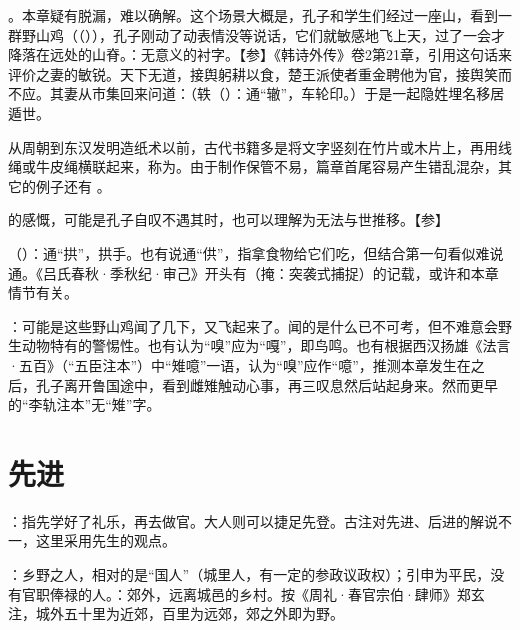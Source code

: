 {
\item {}。本章疑有脱漏，难以确解。这个场景大概是，孔子和学生们经过一座山，看到一群野山鸡（（）），孔子刚动了动表情没等说话，它们就敏感地飞上天，过了一会才降落在远处的山脊。：无意义的衬字。【参】《韩诗外传》卷2第21章，引用这句话来评价之妻的敏锐。天下无道，接舆躬耕以食，楚王派使者重金聘他为官，接舆笑而不应。其妻从市集回来问道：（轶（）：通“辙”，车轮印。）于是一起隐姓埋名移居遁世。

从周朝到东汉发明造纸术以前，古代书籍多是将文字竖刻在竹片或木片上，再用线绳或牛皮绳横联起来，称为。由于制作保管不易，篇章首尾容易产生错乱混杂，其它的例子还有   。

\item {}的感慨，可能是孔子自叹不遇其时，也可以理解为无法与世推移。【参】 
\item {}（）：通“拱”，拱手。也有说通“供”，指拿食物给它们吃，但结合第一句看似难说通。《吕氏春秋·季秋纪·审己》开头有（掩：突袭式捕捉）的记载，或许和本章情节有关。
\item {}：可能是这些野山鸡闻了几下，又飞起来了。闻的是什么已不可考，但不难意会野生动物特有的警惕性。也有认为“嗅”应为“嘎”，即鸟鸣。也有根据西汉扬雄《法言·五百》（“五臣注本”）中“雉噫”一语，认为“嗅”应作“噫”，推测本章发生在之后，孔子离开鲁国途中，看到雌雉触动心事，再三叹息然后站起身来。然而更早的“李轨注本”无“雉”字。
}
{}



\chapter{先进}

{
\item {}：指先学好了礼乐，再去做官。大人则可以捷足先登。古注对先进、后进的解说不一，这里采用先生的观点。

\item {}：乡野之人，相对的是“国人”（城里人，有一定的参政议政权）；引申为平民，没有官职俸禄的人。：郊外，远离城邑的乡村。按《周礼·春官宗伯·肆师》郑玄注，城外五十里为近郊，百里为远郊，郊之外即为野。
}
{}



